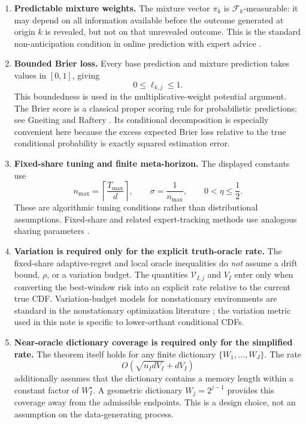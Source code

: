 \documentclass[11pt]{article}
\newcommand{\F}{\mathcal{F}}
\newcommand{\1}{\mathbf{1}}
\begin{document}
\begin{enumerate}[leftmargin=*]
    \item \textbf{Predictable mixture weights.}
    The mixture vector $\pi_k$ is $\F_k$-measurable: it may depend on all
    information available before the outcome generated at origin $k$ is
    revealed, but not on that unrevealed outcome.  This is the standard
    non-anticipation condition in online prediction with expert advice
    \cite{cesabianchi2006}.

    \item \textbf{Bounded Brier loss.}
    Every base prediction and mixture prediction takes values in $[0,1]$,
    giving
    \[
        0\le \ell_{k,j}\le1.
    \]
    This boundedness is used in the multiplicative-weight potential argument.
    The Brier score is a classical proper scoring rule for probabilistic
    predictions; see Gneiting and Raftery \cite{gneiting2007}.
    Its conditional decomposition is especially convenient here because the
    excess expected Brier loss relative to the true conditional probability is
    exactly squared estimation error.

    \item \textbf{Fixed-share tuning and finite meta-horizon.}
    The displayed constants use
    \[
        n_{\max}
        =
        \left\lceil
            \frac{T_{\max}}{d}
        \right\rceil,
        \qquad
        \sigma=\frac1{n_{\max}},
        \qquad
        0<\eta\le\frac12.
    \]
    These are algorithmic tuning conditions rather than distributional
    assumptions.  Fixed-share and related expert-tracking methods use
    analogous sharing parameters
    \cite{herbster1998,gradu2023}.

    \item \textbf{Variation is required only for the explicit
    truth-oracle rate.}
    The fixed-share adaptive-regret and local oracle inequalities do
    \emph{not} assume a drift bound, $\rho$, or a variation budget.
    The quantities $\mathcal V_{I,j}$ and $V_I$ enter only when converting
    the best-window risk into an explicit rate relative to the current true
    CDF.  Variation-budget models for nonstationary environments are standard
    in the nonstationary optimization literature
    \cite{besbes2015}; the variation metric used in this note is specific to
    lower-orthant conditional CDFs.

    \item \textbf{Near-oracle dictionary coverage is required only for the
    simplified rate.}
    The theorem itself holds for any finite dictionary
    $\{W_1,\ldots,W_J\}$.  The rate
    \[
        O\!\left(
            \sqrt{n_IdV_I}+dV_I
        \right)
    \]
    additionally assumes that the dictionary contains a memory length within
    a constant factor of $W_I^\star$.  A geometric dictionary
    $W_j=2^{j-1}$ provides this coverage away from the admissible endpoints.
    This is a design choice, not an assumption on the data-generating process.


\end{enumerate}
\end{document}
